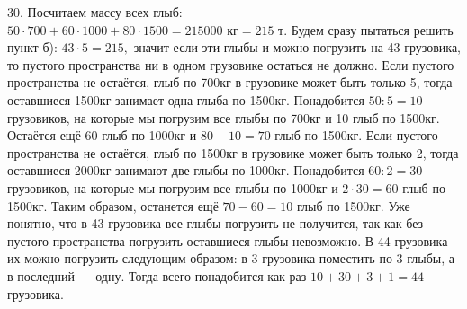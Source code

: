30. Посчитаем массу всех глыб: $50\cdot700+60\cdot1000+80\cdot1500=215000\text{ кг}=215\text{ т}.$ Будем сразу пытаться решить пункт б): $43\cdot5=215,$ значит если эти глыбы и можно погрузить на 43 грузовика, то пустого пространства ни в одном грузовике остаться не должно. Если пустого пространства не остаётся, глыб по 700кг в грузовике может быть только 5, тогда оставшиеся 1500кг занимает одна глыба по 1500кг. Понадобится $50:5=10$ грузовиков, на которые мы погрузим все глыбы по 700кг и 10 глыб по 1500кг. Остаётся ещё 60 глыб по 1000кг и $80-10=70$ глыб по 1500кг. Если пустого пространства не остаётся, глыб по 1500кг в грузовике может быть только 2, тогда оставшиеся 2000кг занимают две глыбы по 1000кг. Понадобится $60:2=30$ грузовиков, на которые мы погрузим все глыбы по 1000кг и $2\cdot30=60$ глыб по 1500кг. Таким образом, останется ещё $70-60=10$ глыб по 1500кг. Уже понятно, что в 43 грузовика все глыбы погрузить не получится, так как без пустого пространства погрузить оставшиеся глыбы невозможно. В 44 грузовика их можно погрузить следующим образом: в 3 грузовика поместить по 3 глыбы, а в последний --- одну. Тогда всего понадобится как раз $10+30+3+1=44$ грузовика.\\
